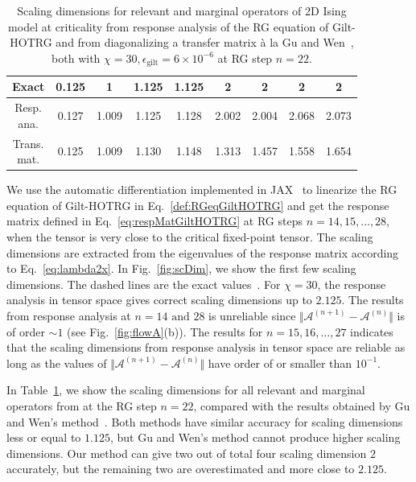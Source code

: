 \documentclass[aps,prb,reprint,superscriptaddress]{revtex4-2}
\begin{document}
\begin{table}[h]%
\caption{Scaling dimensions for relevant and marginal operators of 2D
Ising model at criticality from response analysis of the RG equation
of Gilt-HOTRG and from diagonalizing a
transfer matrix \`a la Gu and Wen~\cite{GuWen2009}, both with $\chi =
30, \epsilon_{\text{gilt}} = 6\times 10^{-6}$ at RG step $n =
22$.\label{table:scDim}} 
\begin{ruledtabular}
\begin{tabular}{ c c c c c c c c c }
Exact      & 0.125 & 1 & 1.125 & 1.125 & 2 & 2 & 2 & 2 \\
\hline
\thead{Resp.\\ ana.} & 0.127 & 1.009 & 1.125 & 1.128 & 2.002 &
2.004 & 2.068 & 2.073 \\
\thead{Trans.\\ mat.} & 0.125 & 1.009 & 1.130 & 1.148 & 1.313 &
1.457 & 1.558 & 1.654
\end{tabular}
\end{ruledtabular}
\end{table}
%

We use the automatic differentiation implemented in
JAX~\cite{jax2018github} to linearize the RG equation of Gilt-HOTRG in
Eq.~\eqref{def:RGeqGiltHOTRG} and get the response matrix defined in
Eq.~\eqref{eq:respMatGiltHOTRG} at RG steps $n = 14,15,\ldots, 28$, when the
tensor is very close to the critical fixed-point tensor. The scaling
dimensions are extracted from the eigenvalues of the response matrix
according to Eq.~\eqref{eq:lambda2x}. In Fig.~\ref{fig:scDim}, we show
the first few scaling dimensions. The dashed lines are the exact
values~\cite{DiFrancesco1997}. For $\chi = 30$, the response analysis in
tensor space gives correct scaling dimensions up to $2.125$. The results from
response analysis at $n = 14 \text{ and } 28$ is unreliable since $\Vert
\mathcal{A}^{(n+1)} - \mathcal{A}^{(n)}\Vert$ is of order $\sim 1$ (see
Fig.~\ref{fig:flowA}(b)). The results for $n = 15,16,\ldots,27$
indicates that the scaling dimensions from response analysis in tensor
space are reliable as long as the values of $\Vert \mathcal{A}^{(n+1)} -
\mathcal{A}^{(n)}\Vert$ have order of or smaller than $10^{-1}$. 
%

In Table~\ref{table:scDim}, we show the scaling dimensions for all
relevant and marginal operators from at the RG step $n = 22$, compared with
the results obtained by Gu and Wen's method~\cite{GuWen2009}. Both
methods have similar accuracy for scaling dimensions less or equal to
$1.125$, but Gu and Wen's method cannot produce higher scaling
dimensions. Our method can give two out of total four scaling dimension
$2$ accurately, but the remaining two are overestimated and more close
to $2.125$.
%
\end{document}
